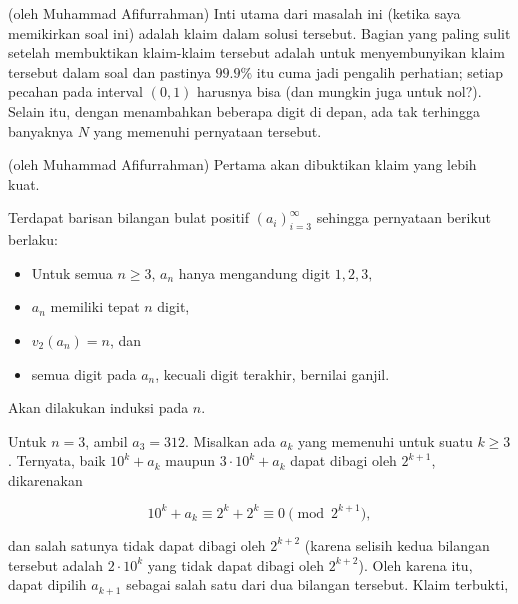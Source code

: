 

\begin{motivasi}(oleh Muhammad Afifurrahman)
    Inti utama dari masalah ini (ketika saya memikirkan soal ini) adalah klaim dalam solusi tersebut. Bagian yang paling sulit setelah membuktikan klaim-klaim tersebut adalah untuk menyembunyikan klaim tersebut dalam soal dan pastinya $99.9 \%$ itu cuma jadi pengalih perhatian; setiap pecahan pada interval $(0,1)$ harusnya bisa (dan mungkin juga untuk nol?). Selain itu, dengan menambahkan beberapa digit di depan, ada tak terhingga banyaknya $N$ yang memenuhi pernyataan tersebut.
\end{motivasi}

\begin{solusi}(oleh Muhammad Afifurrahman)
    Pertama akan dibuktikan klaim yang lebih kuat.
    
    \begin{claim*}
        Terdapat barisan bilangan bulat positif $(a_i)_{i=3}^\infty$ sehingga pernyataan berikut berlaku: 
        \begin{itemize}
            \item Untuk semua $n\geq 3$, $a_n$ hanya mengandung digit $1, 2, 3,$
            
            \item $a_n$ memiliki tepat $n$ digit,
            
            \item $v_2(a_n)=n$, dan 
            
            \item semua digit pada $a_n$, kecuali digit terakhir, bernilai ganjil.
        \end{itemize}
        \begin{bukti}
            Akan dilakukan induksi pada $n$. 
            
            Untuk $n=3$, ambil $a_3=312$. Misalkan ada $a_k$ yang memenuhi untuk suatu $k\geq 3$. Ternyata, baik $10^k+a_k$ maupun $3 \cdot 10^k+a_k$ dapat dibagi oleh $2^{k+1}$, dikarenakan
            
            \[ 10^k+a_k \equiv 2^k + 2^k \equiv 0 \pmod {2^{k+1}}, \]
            
            dan salah satunya tidak dapat dibagi oleh $2^{k+2}$ (karena selisih kedua bilangan tersebut adalah $2 \cdot 10^k$ yang tidak dapat dibagi oleh $2^{k+2}$). Oleh karena itu, dapat dipilih $a_{k+1}$ sebagai salah satu dari dua bilangan tersebut. Klaim terbukti,
        \end{bukti}
    \end{claim*}


\end{solusi}
